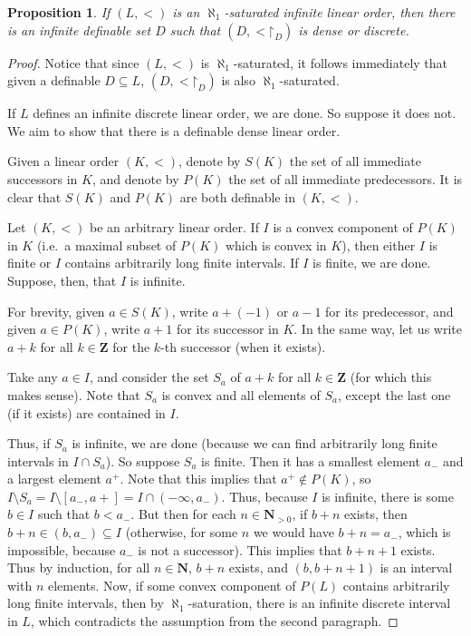 \documentclass[final,a4paper,12pt]{amsart}
\newcommand{\bN}{{\mathbf{N}}}
\newcommand{\bZ}{{\mathbf{Z}}}
\newcommand{\restr}{\mathord{\upharpoonright}}
\newtheorem{prop}[thm]{Proposition}
\theoremstyle{remark}
\theoremstyle{definition}
\newcounter{claimcounter}[thm]
\newenvironment{clm}{\stepcounter{claimcounter}{\noindent {\textbf{Claim}} \theclaimcounter:}}{}
\newenvironment{clmproof}[1][\proofname]{\proof[#1]\renewcommand{\qedsymbol}{$\square$(claim)}}{\endproof}
\begin{document}
	\begin{prop}
		If $(L,<)$ is an $\aleph_1$-saturated infinite linear order, then there is an infinite definable set $D$ such that $(D,{<}\restr_D)$ is dense or discrete.
	\end{prop}
	\begin{proof}
		Notice that since $(L,<)$ is $\aleph_1$-saturated, it follows immediately that given a definable $D\subseteq L$, $(D,{<}\restr_{D})$ is also $\aleph_1$-saturated.
		
		If $L$ defines an infinite discrete linear order, we are done. So suppose it does not. We aim to show that there is a definable dense linear order.
		
		Given a linear order $(K,<)$, denote by $S(K)$ the set of all immediate successors in $K$, and denote by $P(K)$ the set of all immediate predecessors. It is clear that $S(K)$ and $P(K)$ are both definable in $(K,<)$.
		
		
		\begin{clm}
			Let $(K,<)$ be an arbitrary linear order. If $I$ is a convex component of $P(K)$ in $K$ (i.e.\ a maximal subset of $P(K)$ which is convex in $K$), then either $I$ is finite or $I$ contains arbitrarily long finite intervals.
		\end{clm}
		\begin{clmproof}
			If $I$ is finite, we are done. Suppose, then, that $I$ is infinite.
			
			For brevity, given $a\in S(K)$, write $a+(-1)$ or $a-1$ for its predecessor, and given $a\in P(K)$, write $a+1$ for its successor in $K$. In the same way, let us write $a+k$ for all $k\in \bZ$ for the $k$-th successor (when it exists).
			
			Take any $a\in I$, and consider the set $S_a$ of $a+k$ for all $k\in \bZ$ (for which this makes sense). Note that $S_a$ is convex and all elements of $S_a$, except the last one (if it exists) are contained in $I$.
			
			Thus, if $S_a$ is infinite, we are done (because we can find arbitrarily long finite intervals in $I\cap S_a$). So suppose $S_a$ is finite. Then it has a smallest element $a_-$ and a largest element $a^+$. Note that this implies that $a^+\notin P(K)$, so $I\setminus S_a=I\setminus [a_-,a+]=I\cap (-\infty,a_-)$. Thus, because $I$ is infinite, there is some $b\in I$ such that $b<a_-$. But then for each $n\in \bN_{>0}$, if $b+n$ exists, then $b+n\in (b,a_-)\subseteq I$ (otherwise, for some $n$ we would have $b+n=a_-$, which is impossible, because $a_-$ is not a successor). This implies that $b+n+1$ exists. Thus by induction, for all $n\in \bN$, $b+n$ exists, and $(b,b+n+1)$ is an interval with $n$ elements.
		\end{clmproof}
		Now, if some convex component of $P(L)$ contains arbitrarily long finite intervals, then by $\aleph_1$-saturation, there is an infinite discrete interval in $L$, which contradicts the assumption from the second paragraph.
		

\end{proof}
\end{document}
